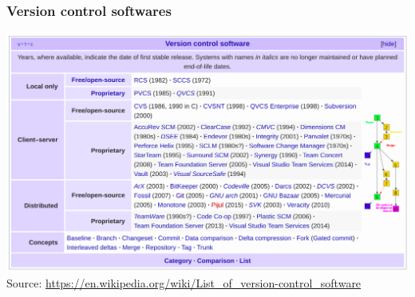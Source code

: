 \documentclass[svgnames]{beamer}
\begin{document}
\begin{frame}
\frametitle{Version control softwares}

\begin{center}
\includegraphics[width=\linewidth]{img/controlVersion.png}
Source: \url{https://en.wikipedia.org/wiki/List_of_version-control_software}
\end{center}
\end{frame}
\end{document}
